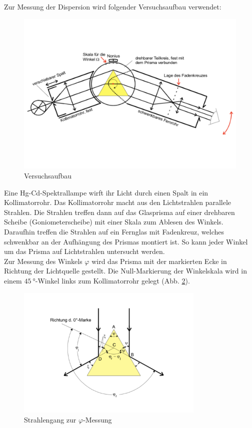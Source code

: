Zur Messung der Dispersion wird folgender Versuchsaufbau verwendet:
\begin{figure}[h!]
  \centering
  \includegraphics[width=\textwidth]{aufbau.pdf}
  \caption{Versuchsaufbau \cite{1}}
  \label{fig:aufbau}
\end{figure}
Eine Hg-Cd-Spektrallampe wirft ihr Licht durch einen Spalt in ein Kollimatorrohr.
Das Kollimatorrohr macht aus den Lichtstrahlen parallele Strahlen.
Die Strahlen treffen dann auf das Glasprisma auf einer drehbaren Scheibe (Goniometerscheibe) mit einer Skala zum Ablesen des Winkels.
Daraufhin treffen die Strahlen auf ein Fernglas mit Fadenkreuz, welches schwenkbar an der Aufhängung des Prismas montiert ist.
So kann jeder Winkel um das Prisma auf Lichtstrahlen untersucht werden.
\\Zur Messung des Winkels $\varphi$ wird das Prisma mit der markierten Ecke in Richtung der Lichtquelle gestellt.
Die Null-Markierung der Winkelskala wird in einem $\SI{45}{°}$-Winkel links zum Kollimatorrohr gelegt (Abb. \ref{fig:phimessung}).
\begin{figure}[h!]
  \centering
  \includegraphics[width=0.8\textwidth]{phimessung.pdf}
  \caption{Strahlengang zur $\varphi$-Messung \cite{1}}
  \label{fig:phimessung}
\end{figure}
